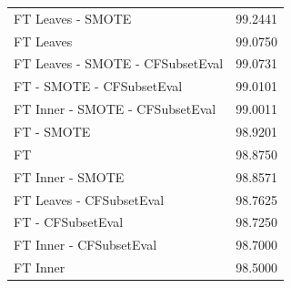 \begin{table}[htbp]
	\begin{tabular}{l r}
		FT Leaves - SMOTE & 99.2441 \\
		FT Leaves & 99.0750 \\
		FT Leaves - SMOTE - CFSubsetEval & 99.0731 \\
		FT - SMOTE - CFSubsetEval & 99.0101 \\
		FT Inner - SMOTE - CFSubsetEval & 99.0011 \\		
		FT - SMOTE & 98.9201 \\
		FT & 98.8750 \\
		FT Inner - SMOTE & 98.8571 \\
		FT Leaves - CFSubsetEval & 98.7625 \\ 
		FT - CFSubsetEval & 98.7250 \\
		FT Inner - CFSubsetEval & 98.7000 \\
		FT Inner & 98.5000 \\
	\end{tabular}
\end{table}